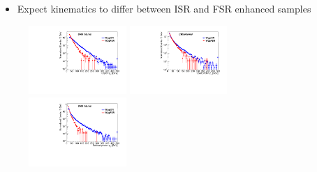 \documentclass{beamer}
\begin{document}
 {

    \begin{itemize}
        \item Expect kinematics to differ between ISR and FSR enhanced samples
    \end{itemize}

    \vspace{4mm}

    \begin{figure}
        \includegraphics[width=0.33\textwidth]{Plots/lep_pt_1l2p.pdf}
        \includegraphics[width=0.33\textwidth]{Plots/lead_phot_pt_1l2p.pdf}
        \includegraphics[width=0.33\textwidth]{Plots/subl_phot_pt_1l2p.pdf}
    \end{figure}

    

}
\end{document}
